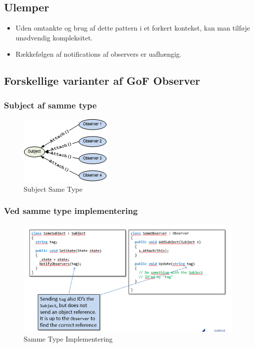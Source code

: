 \documentclass[../report.tex]{subfiles}
\begin{document}
\subsection*{Ulemper}
\begin{itemize}
    \item Uden omtankte og brug af dette pattern i et forkert kontekst, kan man tilføje unødvendig kompleksitet.
    \item Rækkefølgen af notifications af observers er uafhængig.
\end{itemize}

\subsection*{Forskellige varianter af GoF Observer}
\subsubsection*{Subject af samme type}
\begin{figure}[H]
    \centering
    \includegraphics[scale = 1.5]{pics/subject_same_type.PNG}
    \caption{Subject Same Type}
    \label{fig:subject_same_type}
\end{figure}


\subsubsection*{Ved samme type implementering}
\begin{figure}[H]
    \centering
    \includegraphics{pics/same_type_impl.PNG}
    \caption{Samme Type Implementering}
    \label{fig:same_type_impl}
\end{figure}
\end{document}
